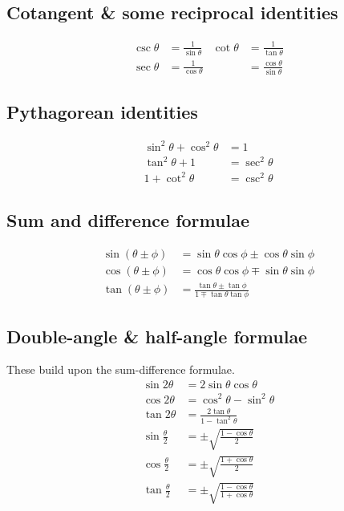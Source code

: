 \documentclass[main.tex]{subfiles}
\begin{document}
	\begin{multicols}{2} \raggedcolumns \setcounter{unbalance}{10}
		\subsection*{Cotangent \& some reciprocal identities}
		\begin{align*}
			\csc\theta &= \frac{1}{\sin\theta} & \cot\theta &= \frac{1}{\tan\theta} \\
			\sec\theta &= \frac{1}{\cos\theta} & &= \frac{\cos\theta}{\sin\theta}
		\end{align*}

		\subsection*{Pythagorean identities}
		\begin{align*}
		\sin^2{\theta} + \cos^2{\theta} &= 1 \\
		\tan^2{\theta} + 1 &= \sec^2{\theta} \\
		1 + \cot^2{\theta} &= \csc^2{\theta}
		\end{align*}

		\subsection*{Sum and difference formulae}
		\begin{align*}
			\sin{(\theta \pm \phi)} &= \sin{\theta}\cos{\phi} \pm \cos{\theta}\sin{\phi} \\
			\cos{(\theta \pm \phi)} &= \cos{\theta}\cos{\phi} \mp \sin{\theta}\sin{\phi} \\
			\tan{(\theta \pm \phi)} &= \frac{\tan{\theta} \pm \tan{\phi}}{1 \mp \tan{\theta}\tan{\phi}}
		\end{align*}

		\subsection*{Double-angle \& half-angle formulae}
		These build upon the sum-difference formulae.
		\begin{align*}
			\sin{2\theta} &= 2\sin{\theta}\cos{\theta} \\
			\cos{2\theta} &= \cos^2{\theta} - \sin^2{\theta} \\
			\tan{2\theta} &= \frac{2\tan{\theta}}{1 - \tan^2\theta} \\
			\sin{\frac{\theta}{2}} &= \pm \sqrt{\frac{1 - \cos\theta}{2}} \\
			\cos{\frac{\theta}{2}} &= \pm \sqrt{\frac{1 + \cos\theta}{2}}\\
			\tan{\frac{\theta}{2}} &= \pm \sqrt{\frac{1 - \cos\theta}{1 + \cos\theta}}
		\end{align*}


\end{multicols}
\end{document}
